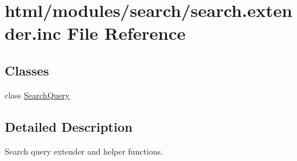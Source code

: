 \hypertarget{search_8extender_8inc}{
\section{html/modules/search/search.extender.inc File Reference}
\label{search_8extender_8inc}
}
\subsection*{Classes}
\begin{DoxyCompactItemize}
\item 
class \hyperlink{classSearchQuery}{SearchQuery}
\end{DoxyCompactItemize}


\subsection{Detailed Description}
Search query extender and helper functions. 